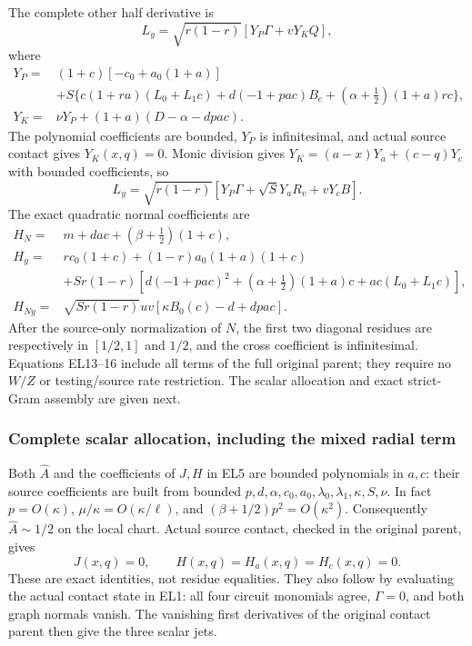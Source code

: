 The complete other half derivative is
\[
 L_y=\sqrt{r(1-r)}[Y_P\Gamma+vY_KQ],             \tag{EL14}
\]
where
\[
\begin{aligned}
 Y_P={}&(1+c)[-c_0+a_0(1+a)]\\
 &+S\{c(1+ra)(L_0+L_1c)+d(-1+pac)B_c
                   +(\alpha+\tfrac12)(1+a)rc\},\\
 Y_K={}&\nu Y_P+(1+a)(D-\alpha-dpac).
\end{aligned}
\]
The polynomial coefficients are bounded, $Y_P$ is infinitesimal,
and actual source contact gives $Y_K(x,q)=0$.  Monic division gives
$Y_K=(a-x)Y_a+(c-q)Y_c$ with bounded coefficients, so
\[
 L_y=\sqrt{r(1-r)}[Y_P\Gamma+\sqrt S Y_aR_v+vY_cB].
                                                               \tag{EL15}
\]
The exact quadratic normal coefficients are
\[
\begin{aligned}
 H_N={}&m+dac+(\beta+\tfrac12)(1+c),\\
 H_y={}&rc_0(1+c)+(1-r)a_0(1+a)(1+c)\\
 &+Sr(1-r)[d(-1+pac)^2+(\alpha+\tfrac12)(1+a)c
                         +ac(L_0+L_1c)],\\
 H_{Ny}={}&\sqrt{Sr(1-r)}uv[\kappa B_0(c)-d+dpac].
\end{aligned}                                                     \tag{EL16}
\]
After the source-only normalization of $N$, the first two diagonal
residues are respectively in $[1/2,1]$ and $1/2$, and the cross
coefficient is infinitesimal.  Equations EL13--16 include all terms
of the full original parent; they require no $W/Z$ or testing/source
rate restriction.  The scalar allocation and exact strict-Gram assembly are given next.

\subsubsection*{Complete scalar allocation, including the mixed radial term}
Both $\widehat A$ and the coefficients of $J,H$ in EL5 are
bounded polynomials in $a,c$: their source coefficients are built
from bounded $p,d,\alpha,c_0,a_0,\lambda_0,\lambda_1,\kappa,S,\nu$.
In fact $p=O(\kappa)$,
$\mu/\kappa=O(\kappa/\ell)$, and
$(\beta+1/2)p^2=O(\kappa^2)$.
Consequently $\widehat A\sim1/2$ on the local chart.
Actual source contact, checked in the original parent, gives
\[
 J(x,q)=0,\qquad H(x,q)=H_a(x,q)=H_c(x,q)=0.        \tag{EL17}
\]
These are exact identities, not residue equalities.  They also follow
by evaluating the actual contact state in EL1: all four circuit
monomials agree, $\Gamma=0$, and both graph normals vanish.
The vanishing first derivatives of the original contact parent
then give the three scalar jets.  

